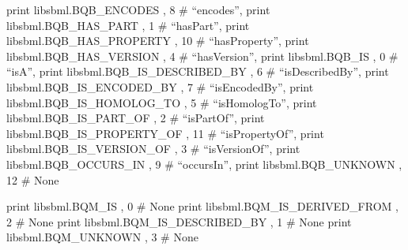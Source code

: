 \documentclass[letterpaper,10pt,english]{sphinxmanual}
\begin{document}
\begin{fulllineitems}
\label{\detokenize{modules_doc:cbmpy.CBXML.SBML_NS}}
\pysigstartsignatures
{}
\pysigstopsignatures
\sphinxAtStartPar
print libsbml.BQB\_ENCODES            , 8  \# “encodes”,
print libsbml.BQB\_HAS\_PART           , 1  \# “hasPart”,
print libsbml.BQB\_HAS\_PROPERTY       , 10 \# “hasProperty”,
print libsbml.BQB\_HAS\_VERSION        , 4  \# “hasVersion”,
print libsbml.BQB\_IS                 , 0  \# “isA”,
print libsbml.BQB\_IS\_DESCRIBED\_BY    , 6  \# “isDescribedBy”,
print libsbml.BQB\_IS\_ENCODED\_BY      , 7  \# “isEncodedBy”,
print libsbml.BQB\_IS\_HOMOLOG\_TO      , 5  \# “isHomologTo”,
print libsbml.BQB\_IS\_PART\_OF         , 2  \# “isPartOf”,
print libsbml.BQB\_IS\_PROPERTY\_OF     , 11 \# “isPropertyOf”,
print libsbml.BQB\_IS\_VERSION\_OF      , 3  \# “isVersionOf”,
print libsbml.BQB\_OCCURS\_IN          , 9  \# “occursIn”,
print libsbml.BQB\_UNKNOWN            , 12 \# None

\sphinxAtStartPar
print libsbml.BQM\_IS                 , 0 \# None
print libsbml.BQM\_IS\_DERIVED\_FROM    , 2 \# None
print libsbml.BQM\_IS\_DESCRIBED\_BY    , 1 \# None
print libsbml.BQM\_UNKNOWN            , 3 \# None

\end{fulllineitems}
\end{document}
